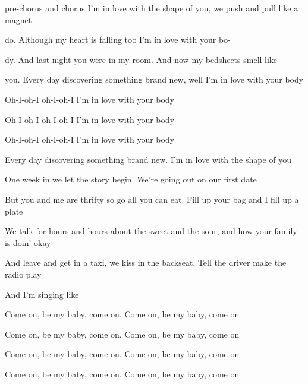 \begin{song}
\begin{chorusbox}{pre-chorus and chorus}
 I'm in love with the shape of you, we push and pull like a magnet \par
{}do. Although my heart is falling too I'm in love with your bo- \par
{}dy. And last night you were in my room. And now my bedsheets smell like \par
{}you. Every day discovering something brand new, well I'm in love with your body \par
{}Oh-I-oh-I oh-I-oh-I  I'm in love with your body \par
{}Oh-I-oh-I oh-I-oh-I  I'm in love with your body \par
{}Oh-I-oh-I oh-I-oh-I  I'm in love with your body \par
{} Every day discovering something brand new. I'm in love with the shape of you \par
\end{chorusbox}

\bigskip

One week in we let the story begin. We're going out on our first date \par
But you and me are thrifty so go all you can eat. Fill up your bag and I fill up a plate \par
We talk for hours and hours about the sweet and the sour, and how your family is doin' okay \par
And leave and get in a taxi, we kiss in the backseat. Tell the driver make the radio play \par
And I'm singing like \par

\bigskip


\bigskip

 \par
Come on, be my baby, come on. Come on, be my baby, come on \par
Come on, be my baby, come on. Come on, be my baby, come on \par
{} Come on, be my baby, come on.  Come on, be my baby, come on \par
{} Come on, be my baby, come on.  Come on, be my baby, come on \par


\end{song}
